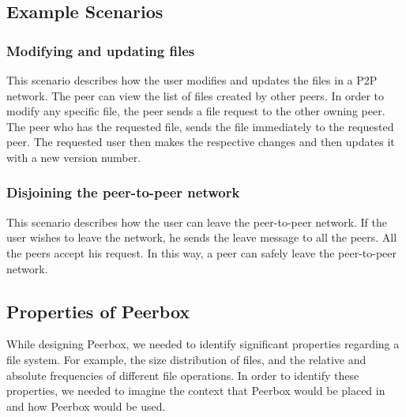 
\subsection{Example Scenarios}


\subsubsection{Modifying and updating files}
This scenario describes how the user modifies and updates the files in a P2P network. The peer can view the list of files created by other peers. In order to modify any specific file, the peer sends a file request to the other owning peer. The peer who has the requested file, sends the file immediately to the requested peer. The requested user then makes the respective changes and then updates it with a new version number.  

\subsubsection{Disjoining the peer-to-peer network}
This scenario describes how the user can leave the peer-to-peer network. If the user wishes to leave the network, he sends the leave message to all the peers. All the peers accept his request. In this way, a peer can safely leave the peer-to-peer network.

\subsection{Properties of Peerbox}

While designing Peerbox, we needed to identify significant properties regarding a file system. For example, the size distribution of files, and the relative and absolute frequencies of different file operations. In order to identify these properties, we needed to imagine the context that Peerbox would be placed in and how Peerbox would be used.

